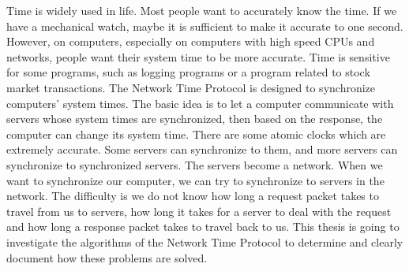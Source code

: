 

Time is widely used in life. Most people want to accurately know the time. If
we have a mechanical watch, maybe it is sufficient to make it accurate to one
second. However, on computers, especially on computers with high speed CPUs and
networks, people want their system time to be more accurate.  Time is sensitive
for some programs, such as logging programs or a program related to stock
market transactions. The Network Time Protocol is designed to synchronize
computers' system times. The basic idea is to let a computer communicate with
servers whose system times are synchronized, then based on the response, the
computer can change its system time. There are some atomic clocks which are
extremely accurate. Some servers can synchronize to them, and more servers can
synchronize to synchronized servers. The servers become a network.  When we
want to synchronize our computer, we can try to synchronize to servers in the
network.  The difficulty is we do not know how long a request packet takes to
travel from us to servers, how long it takes for a server to deal with the
request and how long a response packet takes to travel back to us.  This thesis
is going to investigate the algorithms of the Network Time Protocol to
determine and clearly document how  these problems are solved.


\afterpreface
